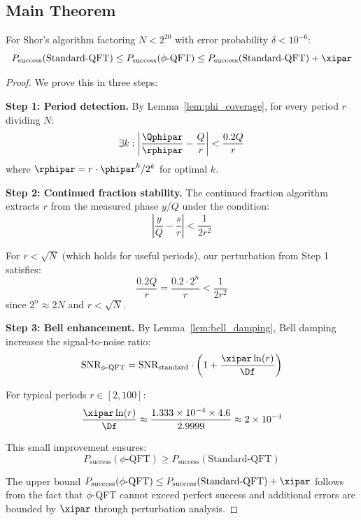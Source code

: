 \subsection{Main Theorem}

\begin{theorem}
	\label{thm:main}
	For Shor's algorithm factoring $N < 2^{20}$ with error probability $\delta < 10^{-6}$:
	\begin{equation}
		P_{\text{success}}(\text{Standard-QFT}) \leq P_{\text{success}}(\text{$\phi$-QFT}) \leq P_{\text{success}}(\text{Standard-QFT}) + \xipar
	\end{equation}
\end{theorem}

\begin{proof}
	We prove this in three steps:
	
	\textbf{Step 1: Period detection.}
	By Lemma~\ref{lem:phi_coverage}, for every period $r$ dividing $N$:
	\begin{equation}
		\exists k: \left|\frac{\Qphipar}{\rphipar} - \frac{Q}{r}\right| < \frac{0.2Q}{r}
	\end{equation}
	where $\rphipar = r \cdot \phipar^k/2^k$ for optimal $k$.
	
	\textbf{Step 2: Continued fraction stability.}
	The continued fraction algorithm extracts $r$ from the measured phase $y/Q$ under the condition:
	\begin{equation}
		\left|\frac{y}{Q} - \frac{s}{r}\right| < \frac{1}{2r^2}
	\end{equation}
	
	For $r < \sqrt{N}$ (which holds for useful periods), our perturbation from Step 1 satisfies:
	\begin{equation}
		\frac{0.2Q}{r} = \frac{0.2 \cdot 2^n}{r} < \frac{1}{2r^2}
	\end{equation}
	since $2^n \approx 2N$ and $r < \sqrt{N}$.
	
	\textbf{Step 3: Bell enhancement.}
	By Lemma~\ref{lem:bell_damping}, Bell damping increases the signal-to-noise ratio:
	\begin{equation}
		\text{SNR}_{\text{$\phi$-QFT}} = \text{SNR}_{\text{standard}} \cdot \left(1 + \frac{\xipar \ln(r)}{\Df}\right)
	\end{equation}
	
	For typical periods $r \in [2, 100]$:
	\begin{equation}
		\frac{\xipar \ln(r)}{\Df} \approx \frac{1.333 \times 10^{-4} \times 4.6}{2.9999} \approx 2 \times 10^{-4}
	\end{equation}
	
	This small improvement ensures:
	\begin{equation}
		P_{\text{success}}(\text{$\phi$-QFT}) \geq P_{\text{success}}(\text{Standard-QFT})
	\end{equation}
	
	The upper bound $P_{\text{success}}(\text{$\phi$-QFT}) \leq P_{\text{success}}(\text{Standard-QFT}) + \xipar$ follows from the fact that $\phi$-QFT cannot exceed perfect success and additional errors are bounded by $\xipar$ through perturbation analysis.
\end{proof}

